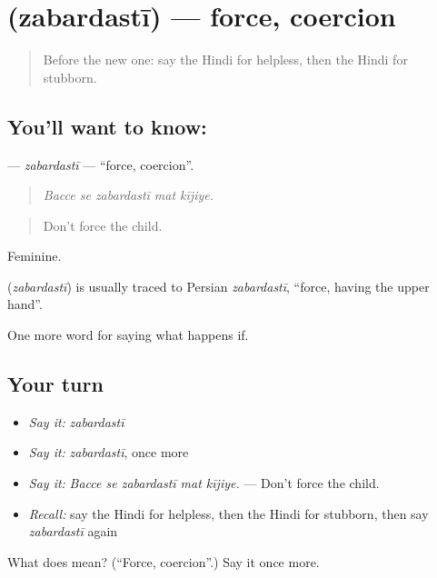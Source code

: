 \section[\texorpdfstring{\hi{ज़बरदस्ती} (zabardastī)}{ज़बरदस्ती (zabardastī)}]{ (zabardastī) — force, coercion}

\label{lesson:HI-C551-zabardasti}



\begin{quote}
Before the new one: say the Hindi for helpless, then the Hindi for stubborn.
\end{quote}

\subsection*{You'll want to know: }
\textbf{} — \emph{zabardastī} — \textquotedblleft{}force, coercion\textquotedblright{}.

\begin{quote}
    
\end{quote}

\begin{quote}
\emph{Bacce se zabardastī mat kījiye.}
\end{quote}

\begin{quote}
Don't force the child.
\end{quote}

Feminine.

\begin{cousinweb}
\textbf{} (\emph{zabardastī}) is usually traced to Persian \emph{zabardastī}, \textquotedblleft{}force, having the upper hand\textquotedblright{}.
\end{cousinweb}

\begin{grammarlens}[title={What you've built}]
One more word for saying what happens if.
\end{grammarlens}

\subsection*{Your turn}
\begin{itemize}
\raggedright
  \item \emph{Say it:} \emph{zabardastī}
  \item \emph{Say it:} \emph{zabardastī}, once more
  \item \emph{Say it:} \emph{Bacce se zabardastī mat kījiye.} — Don't force the child.
  \item \emph{Recall:} say the Hindi for helpless, then the Hindi for stubborn, then say \emph{zabardastī} again
\end{itemize}

\begin{tcolorbox}[breakable,colback=teal!4,colframe=teal!35!black,title={Before you move on}]
What does  mean? (\textquotedblleft{}Force, coercion\textquotedblright{}.) Say it once more.
\end{tcolorbox}
